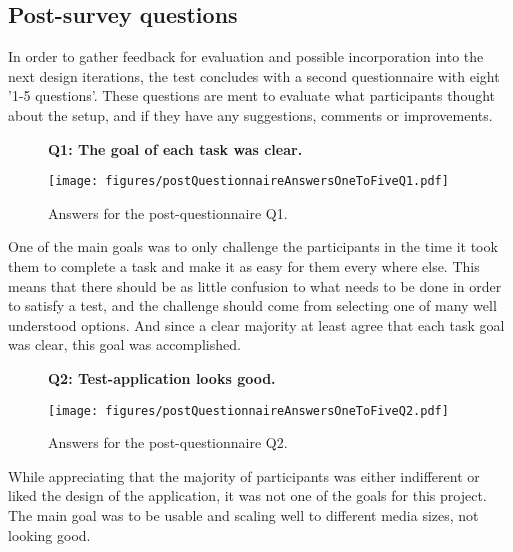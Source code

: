 
  \subsection{Post-survey questions}

    In order to gather feedback for evaluation and possible incorporation
    into the next design iterations, the test concludes with a second
    questionnaire with eight '1-5 questions'. These questions are ment to
    evaluate what participants thought about the setup, and if they have
    any suggestions, comments or improvements.

    \begin{figure}[h!]
      \textbf{Q1: The goal of each task was clear.}
      \begin{center}
        \texttt{[image: figures/postQuestionnaireAnswersOneToFiveQ1.pdf]}
        \vspace{-1cm}
        \caption{Answers for the post-questionnaire Q1.}
      \end{center}
    \end{figure}

    One of the main goals was to only challenge the participants in the
    time it took them to complete a task and make it as easy for them every
    where else. This means that there should be as little confusion to what
    needs to be done in order to satisfy a test, and the challenge should
    come from selecting one of many well understood options. And since a
    clear majority at least agree that each task goal was clear, this goal
    was accomplished.

    \begin{figure}[h!]
      \textbf{Q2: Test-application looks good.}
      \begin{center}
        \texttt{[image: figures/postQuestionnaireAnswersOneToFiveQ2.pdf]}
        \vspace{-1cm}
        \caption{Answers for the post-questionnaire Q2.}
      \end{center}
    \end{figure}

    While appreciating that the majority of participants was either
    indifferent or liked the design of the application, it was not one of
    the goals for this project. The main goal was to be usable and scaling
    well to different media sizes, not looking good.

